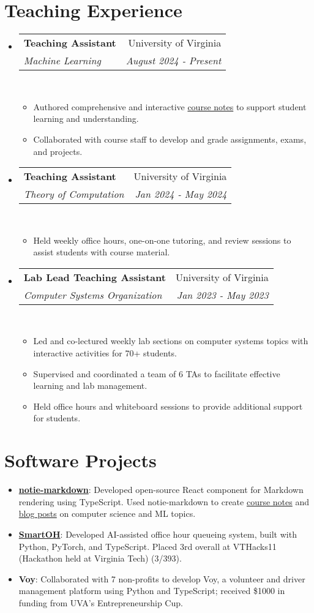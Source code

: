 \documentclass[letterpaper,11pt]{article}
\makeatletter
\newcommand{\linkhref}[2]{\textcolor{linkblue}{\href{#1}{#2}}}
\newcommand{\Date}[1]{\textit{\small #1}}
\newcommand{\resumeSubheading}[4]{
  \item
    \begin{tabular*}{0.9798\textwidth}{l@{\extracolsep{\fill}}r} %
      \textbf{#1} & #2 \\
      \textit{\small#3} & \Date{#4} \\
    \end{tabular*}\
}
\makeatother
\begin{document}
\section{Teaching Experience}
\begin{itemize}
  \resumeSubheading{Teaching Assistant}{University of Virginia}
  {Machine Learning}{August 2024 - Present}
  \begin{itemize}
    \item Authored comprehensive and interactive \linkhref{https://www.brandonyifanyang.com/notes/ml}{course notes} to support student learning and understanding.
    \item Collaborated with course staff to develop and grade assignments, exams, and projects.
  \end{itemize}
  \resumeSubheading{Teaching Assistant}{University of Virginia}
  {Theory of Computation}{Jan 2024 - May 2024}
  \begin{itemize}
    \item Held weekly office hours, one-on-one tutoring, and review sessions to assist students with course material.
  \end{itemize}
  \resumeSubheading{Lab Lead Teaching Assistant}{University of Virginia}
  {Computer Systems Organization}{Jan 2023 - May 2023}
  \begin{itemize}
    \item Led and co-lectured weekly lab sections on computer systems topics with interactive activities for 70+ students.
    \item Supervised and coordinated a team of 6 TAs to facilitate effective learning and lab management.
    \item Held office hours and whiteboard sessions to provide additional support for students.
  \end{itemize}
\end{itemize}

\section{Software Projects}
\begin{itemize}
  \item \textbf{\linkhref{https://notie-markdown.vercel.app/}{notie-markdown}}: Developed open-source React component for Markdown rendering using TypeScript. Used notie-markdown to create \linkhref{https://www.brandonyifanyang.com/notes}{course notes} and \linkhref{https://www.brandonyifanyang.com/blog}{blog posts} on computer science and ML topics.
  \item \textbf{\linkhref{https://github.com/ewei2406/SmartOH}{SmartOH}}: Developed AI-assisted office hour queueing system, built with Python, PyTorch, and TypeScript. Placed 3rd overall at VTHacks11 (Hackathon held at Virginia Tech) (3/393).
  \item \textbf{Voy}: Collaborated with 7 non-profits to develop Voy, a volunteer and driver management platform using Python and TypeScript; received \$1000 in funding from UVA's Entrepreneurship Cup.
\end{itemize}
\end{document}
